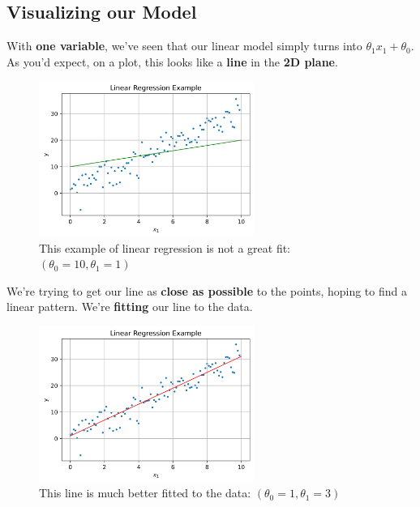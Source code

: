     \subsection{Visualizing our Model}
    
        With \textbf{one variable}, we've seen that our linear model simply turns into $\theta_1 x_1  + \theta_0$. As you'd expect, on a plot, this looks like a \textbf{line} in the \textbf{2D plane}.
        
        \begin{figure}[H]
        \centering
            \includegraphics[width=70mm,scale=0.5]{images/regression_images/Regression_Example_Poor_Fit.png}
        
            \caption*{This example of linear regression is not a great fit: $(\theta_0=10, \theta_1=1)$}
        \end{figure}
        
        We're trying to get our line as \textbf{close as possible} to the points, hoping to find a linear pattern. We're \textbf{fitting} our line to the data.
        
        \begin{figure}[H]
        \centering
            \includegraphics[width=70mm,scale=0.5]{images/regression_images/Regression_Example_Good_Fit.png}
        
            \caption*{This line is much better fitted to the data: $(\theta_0=1, \theta_1=3)$}
        \end{figure}
        
